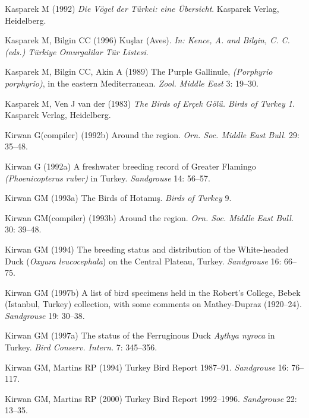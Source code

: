 \documentclass[
  letterpaper,
  DIV=11,
  numbers=noendperiod]{scrreprt}
\newlength{\cslhangindent}
\newenvironment{CSLReferences}[2] %
 {\begin{list}{}{%
  \setlength{\itemindent}{0pt}
  \setlength{\leftmargin}{0pt}
  \setlength{\parsep}{0pt}
  \ifodd #1
   \setlength{\leftmargin}{\cslhangindent}
   \setlength{\itemindent}{-1\cslhangindent}
  \fi
  \setlength{\itemsep}{#2\baselineskip}}}
 {\end{list}}
\begin{document}
\begin{CSLReferences}{0}{1}
Kasparek M (1992) \emph{{Die Vögel der Türkei: eine Übersicht}}.
Kasparek Verlag, Heidelberg.

Kasparek M, Bilgin CC (1996) {Kuşlar (Aves)}. \emph{In: Kence, A. and
Bilgin, C. C. (eds.) Türkiye Omurgalilar Tür Listesi}.

Kasparek M, Bilgin CC, Akin A (1989) {The Purple Gallinule,
\emph{(Porphyrio porphyrio)}, in the eastern Mediterranean}. \emph{Zool.
Middle East} 3: 19--30.

Kasparek M, Ven J van der (1983) \emph{{The Birds of Erçek Gölü. Birds
of Turkey 1}}. Kasparek Verlag, Heidelberg.

Kirwan G(compiler) (1992b) {Around the region}. \emph{Orn. Soc. Middle
East Bull.} 29: 35--48.

Kirwan G (1992a) {A freshwater breeding record of Greater Flamingo
\emph{(Phoenicopterus ruber)} in Turkey}. \emph{Sandgrouse} 14: 56--57.

Kirwan GM (1993a) {The Birds of Hotamış}. \emph{Birds of Turkey} 9.

Kirwan GM(compiler) (1993b) {Around the region}. \emph{Orn. Soc. Middle
East Bull.} 30: 39--48.

Kirwan GM (1994) {The breeding status and distribution of the
White-headed Duck (\emph{Oxyura leucocephala}) on the Central Plateau,
Turkey}. \emph{Sandgrouse} 16: 66--75.

Kirwan GM (1997b) {A list of bird specimens held in the Robert's
College, Bebek (Istanbul, Turkey) collection, with some comments on
Mathey-Dupraz (1920--24)}. \emph{Sandgrouse} 19: 30--38.

Kirwan GM (1997a) {The status of the Ferruginous Duck \emph{Aythya
nyroca} in Turkey}. \emph{Bird Conserv. Intern.} 7: 345--356.

Kirwan GM, Martins RP (1994) {Turkey Bird Report 1987--91}.
\emph{Sandgrouse} 16: 76--117.

Kirwan GM, Martins RP (2000) {Turkey Bird Report 1992--1996}.
\emph{Sandgrouse} 22: 13--35.


\end{CSLReferences}
\end{document}
